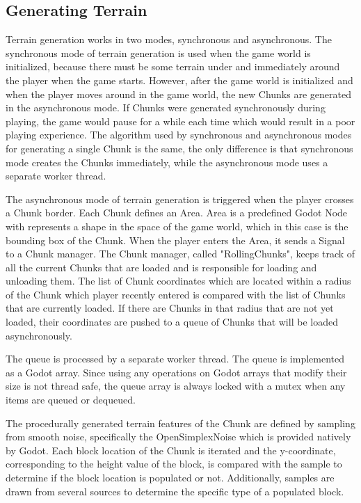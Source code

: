 \documentclass{report}
\begin{document}
\subsection{Generating Terrain}
Terrain generation works in two modes, synchronous and asynchronous. The synchronous mode of terrain generation is used when the game world is initialized, because there must be some terrain under and immediately around the player when the game starts. However, after the game world is initialized and when the player moves around in the game world, the new Chunks are generated in the asynchronous mode. If Chunks were generated synchronously during playing, the game would pause for a while each time which would result in a poor playing experience. The algorithm used by synchronous and asynchronous modes for generating a single Chunk is the same, the only difference is that synchronous mode creates the Chunks immediately, while the asynchronous mode uses a separate worker thread.\par
The asynchronous mode of terrain generation is triggered when the player crosses a Chunk border. Each Chunk defines an Area. Area is a predefined Godot Node with represents a shape in the space of the game world, which in this case is the bounding box of the Chunk. When the player enters the Area, it sends a Signal to a Chunk manager. The Chunk manager, called "RollingChunks", keeps track of all the current Chunks that are loaded and is responsible for loading and unloading them. The list of Chunk coordinates which are located within a radius of the Chunk which player recently entered is compared with the list of Chunks that are currently loaded. If there are Chunks in that radius that are not yet loaded, their coordinates are pushed to a queue of Chunks that will be loaded asynchronously.\par
The queue is processed by a separate worker thread. The queue is implemented as a Godot array. Since using any operations on Godot arrays that modify their size is not thread safe\cite{arraysafe}, the queue array is always locked with a mutex when any items are queued or dequeued.\par
The procedurally generated terrain features of the Chunk are defined by sampling from smooth noise, specifically the OpenSimplexNoise\cite{opensimplex} which is provided natively by Godot. Each block location of the Chunk is iterated and the y-coordinate, corresponding to the height value of the block, is compared with the sample to determine if the block location is populated or not. Additionally, samples are drawn from several sources to determine the specific type of a populated block.\par
\end{document}
